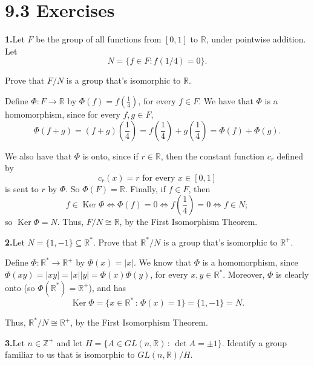 \documentclass[10pt,]{book}
\theoremstyle{plain}
\theoremstyle{definition}
\theoremstyle{definition}
\theoremstyle{definition}
\theoremstyle{definition}
\numberwithin{equation}{section}
\def\Z{\mathbb{Z}}
\def\R{\mathbb{R}}
\DeclareMathOperator{\Ker}{Ker}
\begin{document}
\section*{9.3 Exercises}
\noindent\textbf{1.}\quad{}Let \(F\) be the group of all functions from \([0,1]\) to \(\R\), under pointwise addition. Let%
\begin{equation*}
N=\{f\in F:
f(1/4)=0\}.
\end{equation*}
%
\par
Prove that \(F/N\) is a group that's isomorphic to \(\R\).%
\par\smallskip
Define \(\Phi:F\rightarrow \R\) by \(\Phi(f)=f\left(\frac{1}{4}\right)\), for every \(f\in F\). We have that \(\Phi\) is a homomorphism, since for every \(f, g\in F\),%
\begin{equation*}
\Phi(f+g)=(f+g)\left(\frac{1}{4}\right)=f\left(\frac{1}{4}\right)+g\left(\frac{1}{4}\right)=\Phi(f)+\Phi(g).
\end{equation*}
%
\par
We also have that \(\Phi\) is onto, since if \(r\in \R\), then the constant function \(c_r\) defined by%
\begin{equation*}
c_r(x)=r \mbox{ for every \(x\in
[0,1]\)}
\end{equation*}
is sent to \(r\) by \(\Phi\). So \(\Phi(F)=\R\). Finally, if \(f\in F\), then%
\begin{equation*}
f\in \Ker \Phi \Leftrightarrow \Phi(f)=0 \Leftrightarrow
f\left(\frac{1}{4}\right)=0 \Leftrightarrow f\in N;
\end{equation*}
so \(\Ker
\Phi=N\). Thus, \(F/N \cong \R\), by the First Isomorphism Theorem.%
\par\smallskip
\noindent\textbf{2.}\quad{}Let \(N=\{1,-1\}\subseteq \R^*\). Prove that \(\R^*/N\) is a group that's isomorphic to \(\R^+\).%
\par\smallskip
Define \(\Phi: \R^* \rightarrow \R^+\) by \(\Phi(x)=|x|\). We know that \(\Phi\) is a homomorphism, since \(\Phi(xy)=|xy|=|x||y|=\Phi(x)\Phi(y)\), for every \(x,y\in \R^*\). Moreover, \(\Phi\) is clearly onto (so \(\Phi(\R^*)=\R^+\)), and has%
\begin{equation*}
\Ker \Phi=\{x\in \R^*\,:\,\Phi(x)=1\}=\{1,-1\}=N.
\end{equation*}
%
\par
Thus, \(\R^*/N \cong \R^+\), by the First Isomorphism Theorem.%
\par\smallskip
\noindent\textbf{3.}\quad{}Let \(n\in \Z^+\) and let \(H=\{A\in GL(n,\R)\,:\, \det A =\pm
1\}\). Identify a group familiar to us that is isomorphic to \(GL(n,\R)/H\).%
\end{document}

